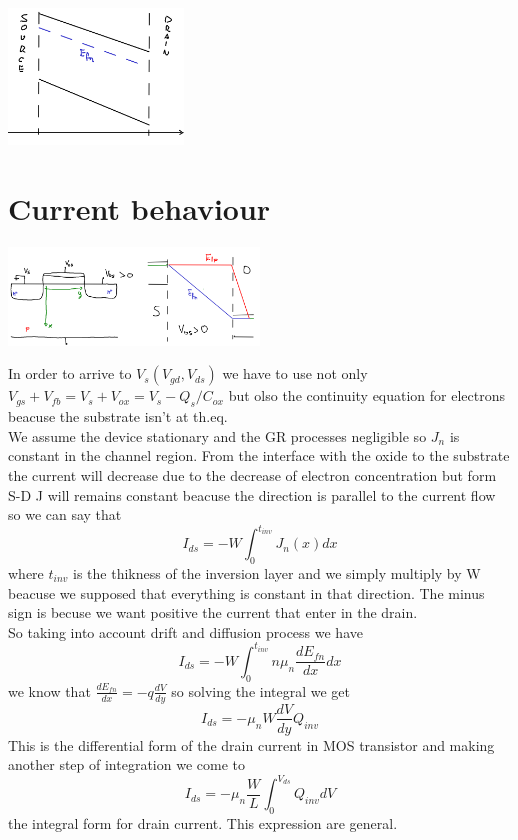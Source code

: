 \centering
\includegraphics[width=0.35\textwidth]{a1.png}\\
\raggedright


\section{Current behaviour}


\centering
\includegraphics[width=0.5\textwidth]{a2.png}\\
\raggedright


In order to arrive to $V_s(V_{gd},V_{ds})$ we have to use not only $V_{gs}+V_{fb}=V_{s}+V_{ox}=V_{s}-Q_s/C_{ox}$ but olso the continuity equation for electrons beacuse the substrate isn't at th.eq.\\
We assume the device stationary and the GR processes negligible so $J_n$ is constant in the channel region. From the interface with the oxide to the substrate the current will decrease due to the decrease of electron concentration but form S-D J will remains constant beacuse the direction is parallel to the current flow so we can say that
\begin{equation}
I_{ds}=-W\int^{t_{inv}}_0 J_n(x)dx
\end{equation}
where $t_{inv}$ is the thikness of the inversion layer and we simply multiply by W beacuse we supposed that everything is constant in that direction. The minus sign is becuse we want positive the current that enter in the drain.\\
So taking into account drift and diffusion process we have 
\begin{equation}
I_{ds}=-W\int^{t_{inv}}_0 n\mu_n \frac{dE_{fn}}{dx} dx
\end{equation}
we know that $\frac{dE_{fn}}{dx}=-q \frac{dV}{dy}$ so solving the integral we get
\begin{equation}
I_{ds}=-\mu_nW \frac{dV}{dy}Q_{inv}
\end{equation}
This is the differential form of the drain current in MOS transistor and making another step of integration we come to 
\begin{equation}
I_{ds}=-\mu_n\frac{W}{L}\int^{V_{ds}}_0Q_{inv}dV
\end{equation}
the integral form for drain current. This expression are general.\\
\vspace{5mm}

